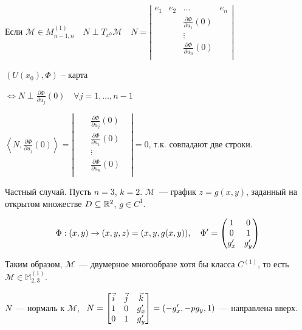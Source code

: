 \begin{note}
    Если $\mathcal M\in M_{n-1,n}^{(1)}\quad N \perp T_{x^0}\mathcal M\quad N = \left|
        \begin{matrix}
            e_1& e_2& \ldots& e_n\\
            && \frac{\partial \Phi}{\partial u_1}(0)&\\
            && \vdots&\\
            && \frac{\partial \Phi}{\partial u_n}(0)&\\
        \end{matrix}
    \right| $

    $(U(x_0), \Phi)$ -- карта

    $\iff N \perp \frac{\partial \Phi}{\partial u_j}(0)\quad \forall j = 1, \ldots, n-1$

    $\left<N, \frac{\partial \Phi}{\partial u_j}(0) \right> = \left|
        \begin{matrix}
            && \frac{\partial \Phi}{\partial u_j}(0)&\\
            && \frac{\partial \Phi}{\partial u_1}(0)&\\
            && \vdots&\\
            && \frac{\partial \Phi}{\partial u_n}(0)&\\
        \end{matrix}
    \right| = 0 $, т.к. совпадают две строки.

    Частный случай. Пусть $n = 3$, $k = 2$. $\mathcal M$~--- график $z = g(x, y)$, заданный на открытом множестве $D \subseteq \mathbb{R}^2$, $g \in C^1$.

    \[ \Phi :(x, y) \to (x, y, z) = (x, y, g(x, y)),~~~
     \Phi^{\prime} = \begin{pmatrix}
        1 & 0 \\ 0 & 1 \\ g^{\prime}_x & g^{\prime}_y
    \end{pmatrix}\]

    Таким образом, $\mathcal{M}$~--- двумерное многообразе хотя бы класса $C^{(1)}$, то есть $\mathcal M \in \mathbb M_{2, 3}^{(1)}$.

    $N$~--- нормаль к $\mathcal{M}$, ~$N = \begin{bmatrix}
        \vec{i}& \vec{j} & \vec{k} \\ 1 & 0 & g^{\prime}_x \\ 0 & 1 & g^{\prime}_y
    \end{bmatrix} = \left( -g^{\prime}_x , -p g_y, 1 \right)$~--- направлена вверх.
\end{note}

